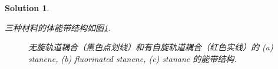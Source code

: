 \documentclass[UTF8,10pt,a4paper]{article}
\theoremstyle{Problem}
\theoremstyle{Solution}
\newtheorem*{sol}{Solution}
\begin{document}
\begin{sol}
\begin{enumerate}
        三种材料的体能带结构如图\ref{1-2-F}.
        \begin{figure}[h]
            \centering
            \caption{无旋轨道耦合（黑色点划线）和有自旋轨道耦合（红色实线）的 (a) stanene, (b) fluorinated stanene, (c) stanane 的能带结构.}
            \label{1-2-F}
        \end{figure}


\end{enumerate}
\end{sol}
\end{document}
